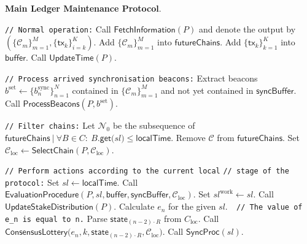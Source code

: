 \bigbreak
\bigbreak
\noindent
\textbf{Main Ledger Maintenance Protocol}.
\begin{protocol}
    \caption{$\textsf{LedgerMaintenance}(P, R, \mathcal{C}_{\text{loc}})$}
    \begin{algorithmic}[1]

        \noindent
        \lstinline|// Normal operation:|
        \State Call $\textsf{FetchInformation}(P)$ and denote the output by $(\{\mathcal{C}_m\}_{m=1}^M, \{\textsf{tx}_k\}_{i=k}^K)$.
        \State Add $\{\mathcal{C}_m\}_{m=1}^M$ into $\textsf{futureChains}$.
        \State Add $\{\textsf{tx}_k\}_{k=1}^K$ into $\textsf{buffer}$.
        \State Call $\textsf{UpdateTime}(P)$.

        \noindent
        \lstinline|// Process arrived synchronisation beacons:|
        \State Extract beacons $b^{\text{set}} \leftarrow \{b^{\text{sync}}_n\}_{n=1}^N$ contained in $\{\mathcal{C}_m\}_{m=1}^M$ and not yet contained in $\textsf{syncBuffer}$.
        \State Call $\textsf{ProcessBeacons}(P, b^{\text{set}})$.

        \noindent
        \lstinline|// Filter chains:|
        \State Let $\mathcal{N}_0$ be the subsequence of $\textsf{futureChains}\ |\ \forall B \in C:\ B{\textsf{.get(} sl \textsf{)}} \leq \textsf{localTime}$.
            \State Remove $\mathcal{C}$ from $\textsf{futureChains}$.
        \EndFor
        \State Set $\mathcal{C}_{\text{loc}} \leftarrow \textsf{SelectChain}(P, \mathcal{C}_{\text{loc}})$.

        \noindent
        \lstinline|// Perform actions according to the current local|
        \noindent
        \lstinline|// stage of the protocol:|
        \State Set $sl \leftarrow \textsf{localTime}$.
            \State Call $\textsf{EvaluationProcedure}(P, sl, \textsf{buffer}, \textsf{syncBuffer}, \mathcal{C}_{\text{loc}})$.
            \State Set $sl^{\text{work}} \leftarrow sl$.
                \State Call $\textsf{UpdateStakeDistribution}(P)$.
                \State Calculate $e_n$ for the given $sl$.\lstinline|  // The value of e_n is equal to n.|
                \State Parse $\textsf{state}_{(n - 2)\cdot R}$ from $C_{\text{loc}}$.
                    \State Call $\textsf{ConsensusLottery(}e_n, k, \textsf{state}_{(n - 2)\cdot R}, \mathcal{C}_{\text{loc}}\textsf{)}$.
                \EndFor
                \State Call $\textsf{SyncProc}(sl)$.
            \EndIf
        \EndIf

    \end{algorithmic}\label{alg:algorithm-0}
\end{protocol}




